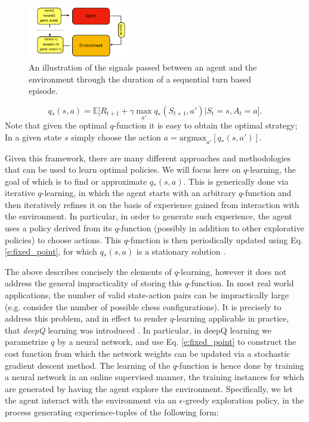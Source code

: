 \documentclass[twocolumn,preprintnumbers,amsmath,amssymb,notitlepage,nofootinbib,longbibliography,superscriptaddress,aps,pra,10pt]{revtex4-1}
\begin{document}
	\begin{figure}
		\centering
		\includegraphics[width=0.4\textwidth]{figures/agent_environment.pdf}
		\caption{
			An illustration of the signals passed between an agent and the environment through the duration of a sequential turn based episode.
		}
		\label{f:agent_environment}
	\end{figure}

	\begin{equation}\label{e:fixed_point}
		q_*(s,a) = \mathbb{E}\big[R_{t+1} + \gamma\max_{a'}q_{*}(S_{t+1},a')\big|S_t = s, A_t = a \big].
	\end{equation}
	Note that given the optimal $q$-function it is easy to obtain the optimal strategy; In a given state $s$ simply choose the action $a = \mathrm{argmax}_{a'}[q_*(s,a')]$.

	Given this framework, there are many different approaches and methodologies that can be used to learn optimal policies.
	We will focus here on $q$-learning, the goal of which is to find or approximate $q_*(s,a)$.
	This is generically done via iterative $q$-learning, in which the agent starts with an arbitrary $q$-function and then iteratively refines it on the basis of experience gained from interaction with the environment.
	In particular, in order to generate such experience, the agent uses a policy derived from its $q$-function (possibly in addition to other explorative policies) to choose actions.
	This $q$-function is then periodically updated using Eq. \eqref{e:fixed_point}, for which $q_*(s,a)$ is a stationary solution \cite{RLSutton18}.

	The above describes concisely the elements of $q$-learning, however it does not address the general impracticality of storing this $q$-function.
	In most real world applications, the number of valid state-action pairs can be impractically large (e.g. consider the number of possible chess configurations).
	It is precisely to address this problem, and in effect to render $q$-learning applicable in practice, that \textit{deepQ} learning was introduced \cite{RLMnih15,RLvan2016deep,RLschaul2015prioritized}.
	In particular, in deepQ learning we parametrize $q$ by a neural network, and use Eq. \eqref{e:fixed_point} to construct the cost function from which the network weights can be updated via a stochastic gradient descent method.
	The learning of the $q$-function is hence done by training a neural network in an online supervised manner, the training instances for which are generated by having the agent explore the environment.
	Specifically, we let the agent interact with the environment via an $\epsilon$-greedy exploration policy, in the process generating experience-tuples of the following form:
\end{document}
